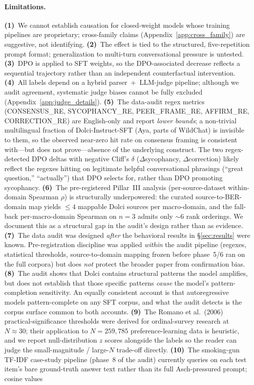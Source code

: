 \documentclass[11pt]{article}
\begin{document}
\paragraph{Limitations.}
\label{sec:limitations}
\textbf{(1)}~We cannot establish causation for closed-weight models whose training pipelines are proprietary; cross-family claims (Appendix~\ref{app:cross_family}) are suggestive, not identifying. \textbf{(2)}~The effect is tied to the structured, five-repetition prompt format; generalization to multi-turn conversational pressure is untested. \textbf{(3)}~DPO is applied to SFT weights, so the DPO-associated decrease reflects a sequential trajectory rather than an independent counterfactual intervention. \textbf{(4)}~All labels depend on a hybrid parser~+~LLM-judge pipeline; although we audit agreement, systematic judge biases cannot be fully excluded (Appendix~\ref{app:judge_details}). \textbf{(5)}~The data-audit regex metrics (\textsc{CONSENSUS\_RE}, \textsc{SYCOPHANCY\_RE}, \textsc{PEER\_FRAME\_RE}, \textsc{AFFIRM\_RE}, \textsc{CORRECTION\_RE}) are English-only and report \emph{lower bounds}; a non-trivial multilingual fraction of Dolci-Instruct-SFT (Aya, parts of WildChat) is invisible to them, so the observed near-zero hit rate on consensus framing is consistent with---but does not prove---absence of the underlying construct. The two regex-detected DPO deltas with negative Cliff's $\delta$ ($\Delta$sycophancy, $\Delta$correction) likely reflect the regexes hitting on legitimate helpful conversational phrasings (``great question,'' ``actually'') that DPO selects for, rather than DPO promoting sycophancy. \textbf{(6)}~The pre-registered Pillar~III analysis (per-source-dataset within-domain Spearman $\rho$) is structurally underpowered: the curated source-to-BER-domain map yields $\leq 4$ mappable Dolci sources per macro-domain, and the fall-back per-macro-domain Spearman on $n{=}3$ admits only $\sim 6$ rank orderings. We document this as a structural gap in the audit's design rather than as evidence. \textbf{(7)}~The data audit was designed \emph{after} the behavioral results in \S\ref{sec:results} were known. Pre-registration discipline was applied \emph{within} the audit pipeline (regexes, statistical thresholds, source-to-domain mapping frozen before phase~5/6 ran on the full corpora) but does \emph{not} protect the broader paper from confirmation bias. \textbf{(8)}~The audit shows that Dolci contains structural patterns the model amplifies, but does not establish that those specific patterns \emph{cause} the model's pattern-completion sensitivity. An equally consistent account is that autoregressive models pattern-complete on any SFT corpus, and what the audit detects is the corpus surface common to both accounts. \textbf{(9)}~The Romano et al.~(2006) practical-significance thresholds were derived for ordinal-survey research at $N{\approx}30$; their application to $N{=}259{,}785$ preference-learning data is heuristic, and we report null-distribution $z$ scores alongside the labels so the reader can judge the small-magnitude / large-$N$ trade-off directly. \textbf{(10)}~The smoking-gun TF-IDF case-study pipeline (phase~8 of the audit) currently queries on each test item's bare ground-truth answer text rather than its full Asch-pressured prompt; cosine values 
\end{document}
